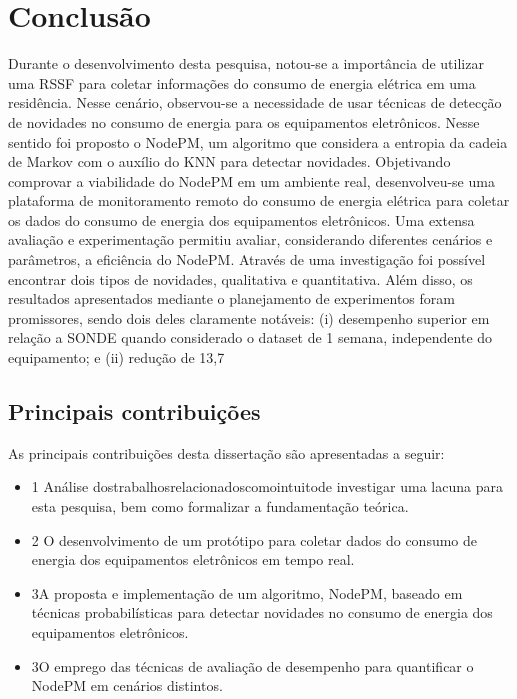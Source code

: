 \chapter{Conclusão}

Durante o desenvolvimento desta pesquisa, notou-se a import\^{a}ncia de utilizar uma RSSF para coletar informa\c{c}\~{o}es do consumo de energia el\'{e}trica em uma resid\^{e}ncia. Nesse cen\'{a}rio, observou-se a necessidade de usar t\'{e}cnicas de detec\c{c}\~{a}o de novidades no consumo de energia para os equipamentos eletr\^{o}nicos. Nesse sentido foi proposto o NodePM, um algoritmo que considera a entropia da cadeia de Markov com o aux\'{i}lio do KNN para detectar novidades. Objetivando comprovar a viabilidade do NodePM em um ambiente real, desenvolveu-se uma plataforma de monitoramento remoto do consumo de energia el\'{e}trica para coletar os dados do consumo de energia dos equipamentos eletr\^{o}nicos.
Uma extensa avalia\c{c}\~{a}o e experimenta\c{c}\~{a}o permitiu avaliar, considerando diferentes cen\'{a}rios e par\^{a}metros, a efici\^{e}ncia do NodePM. Atrav\'{e}s de uma investiga\c{c}\~{a}o foi poss\'{i}vel encontrar dois tipos de novidades, qualitativa e quantitativa. Al\'{e}m disso, os resultados apresentados mediante o planejamento de experimentos foram promissores, sendo dois deles claramente not\'{a}veis: (i) desempenho superior em rela\c{c}\~{a}o a SONDE quando considerado o dataset de 1 semana, independente do equipamento; e (ii) redu\c{c}\~{a}o de 13,7%


\section{Principais contribui\c{c}\~{o}es}
As principais contribui\c{c}\~{o}es desta disserta\c{c}\~{a}o s\~{a}o apresentadas a seguir:
\begin{itemize}
	\item{1} An\'{a}lise dostrabalhosrelacionadoscomointuitode investigar uma lacuna para esta pesquisa, bem como formalizar a fundamenta\c{c}\~{a}o te\'{o}rica.
	\item{2} O desenvolvimento de um prot\'{o}tipo para coletar dados do consumo de energia dos equipamentos eletr\^{o}nicos em tempo real.
	\item{3}A proposta e implementa\c{c}\~{a}o de um algoritmo, NodePM, baseado em t\'{e}cnicas probabil\'{i}sticas para detectar novidades no consumo de energia dos equipamentos eletr\^{o}nicos.
	\item{3}O emprego das t\'{e}cnicas de avalia\c{c}\~{a}o de desempenho para quantificar o NodePM em cen\'{a}rios distintos.
\end{itemize}

